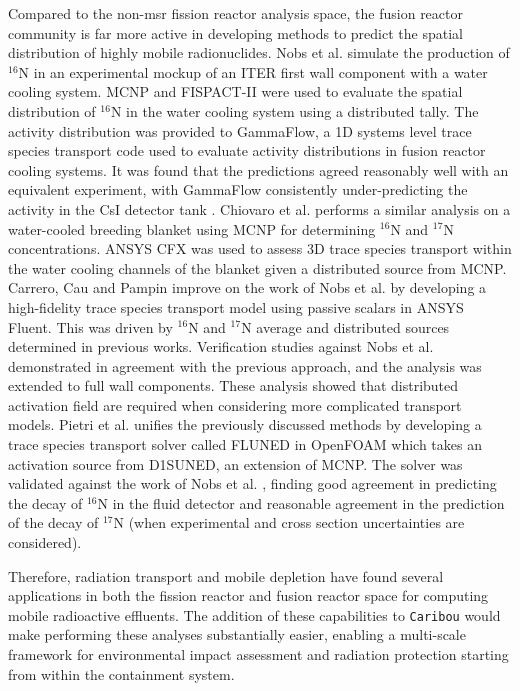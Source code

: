 Compared to the non-\acrshort{msr} fission reactor analysis space, the fusion reactor community is far more active in developing methods to predict the spatial distribution of highly mobile radionuclides. Nobs et al. \cite{fusion_activation_wall} simulate the production of $\mathrm{^{16}N}$ in an experimental mockup of an ITER first wall component with a water cooling system. MCNP and FISPACT-II were used to evaluate the spatial distribution of $\mathrm{^{16}N}$ in the water cooling system using a distributed tally. The activity distribution was provided to GammaFlow, a 1D systems level trace species transport code used to evaluate activity distributions in fusion reactor cooling systems. It was found that the predictions agreed reasonably well with an equivalent experiment, with GammaFlow consistently under-predicting the activity in the CsI detector tank \cite{fusion_activation_wall}. Chiovaro et al. \cite{fusion_activation_demo_wcll} performs a similar analysis on a water-cooled breeding blanket using MCNP for determining $\mathrm{^{16}N}$ and $\mathrm{^{17}N}$ concentrations. ANSYS CFX was used to assess 3D trace species transport within the water cooling channels of the blanket given a distributed source from MCNP. Carrero, Cau and Pampin \cite{fusion_activation_modelling} improve on the work of Nobs et al. \cite{fusion_activation_wall} by developing a high-fidelity trace species transport model using passive scalars in ANSYS Fluent. This was driven by $\mathrm{^{16}N}$ and $\mathrm{^{17}N}$ average and distributed sources determined in previous works. Verification studies against Nobs et al. \cite{fusion_activation_wall} demonstrated in agreement with the previous approach, and the analysis was extended to full wall components. These analysis showed that distributed activation field are required when considering more complicated transport models. Pietri et al. \cite{fusion_activation_tool_fluned} unifies the previously discussed methods by developing a trace species transport solver called FLUNED in OpenFOAM which takes an activation source from D1SUNED, an extension of MCNP. The solver was validated against the work of Nobs et al. \cite{fusion_activation_wall}, finding good agreement in predicting the decay of $\mathrm{^{16}N}$ in the fluid detector and reasonable agreement in the prediction of the decay of $\mathrm{^{17}N}$ (when experimental and cross section uncertainties are considered).

Therefore, radiation transport and mobile depletion have found several applications in both the fission reactor and fusion reactor space for computing mobile radioactive effluents. The addition of these capabilities to \texttt{Caribou} would make performing these analyses substantially easier, enabling a multi-scale framework for environmental impact assessment and radiation protection starting from within the containment system.  

